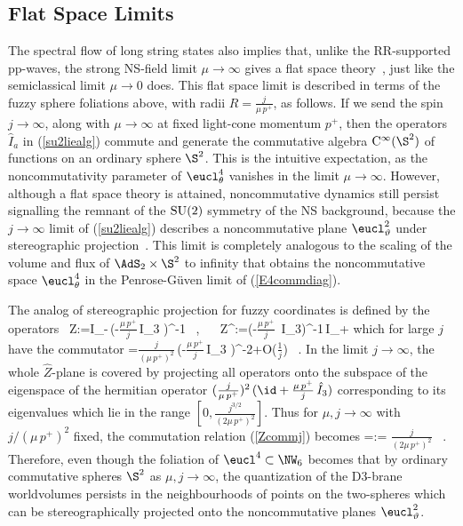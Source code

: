 \subsection{Flat Space Limits\label{FlatLim}}

The spectral flow of long string states also implies that, unlike the
RR-supported pp-waves, the strong NS-field limit $\mu\to\infty$ gives a flat
space theory~\cite{DAK1}, just like the semiclassical limit $\mu\to0$
does. This flat space limit is described in terms of the fuzzy sphere
foliations above, with radii $R=\frac j{\mu\,p^+}$, as follows. If we
send the spin $j\to\infty$, along with $\mu\to\infty$ at fixed
light-cone momentum $p^+$, then the operators $\hat I_a$ in
(\ref{su2liealg}) commute and generate the commutative algebra ${\rm
  C}^\infty(\S^2)$ of functions on an ordinary sphere $\S^2$. This is
the intuitive expectation, as the noncommutativity parameter of
$\eucl_\theta^4$ vanishes in the limit $\mu\to\infty$. However,
although a flat space theory is attained, noncommutative dynamics
still persist signalling the remnant of the ${\rm SU}(2)$ symmetry of
the NS background, because the $j\to\infty$ limit of (\ref{su2liealg})
describes a noncommutative plane $\eucl_\vartheta^2$ under
stereographic projection~\cite{APS1,CMS1}. This limit is completely
analogous to the scaling of the volume and flux of $\AdS_2\times\S^2$ to
infinity that obtains the noncommutative space $\eucl_\theta^4$ in the
Penrose-G\"uven limit of (\ref{E4commdiag}).

The analog of stereographic projection for fuzzy coordinates is
defined by the operators~\cite{APS1,CMS1}
\beq
\hat Z:=\hat I_-\,\left(\id-\mbox{$\frac{\mu\,p^+}j$}\,\hat I_3
\right)^{-1} \ , ~~ \hat Z^\dag:=\left(\id-\mbox{$\frac{\mu\,p^+}j$}\,
\hat I_3\right)^{-1}\,\hat I_+
\label{fuzzystereo}\eeq
which for large $j$ have the commutator
\beq
{}=\mbox{$\frac j{\left(\mu\,p^+
\right)^2}$}\,\left(\id-\mbox{$\frac{\mu\,p^+}j$}\,\hat I_3
\right)^{-2}+O\left(\mbox{$\frac1j$}\right) \ .
\label{Zcommj}\eeq
In the limit $j\to\infty$, the whole $\hat Z$-plane is covered by
projecting all operators onto the subspace of the eigenspace of the
hermitian operator $(\frac j{\mu\,p^+})^2\,(\id+\frac{\mu\,p^+}j\,\hat
I_3)$ corresponding to its eigenvalues which lie in the range
$[0,\frac{j^{3/2}}{(2\mu\,p^+)^2}]$. Thus for $\mu,j\to\infty$ with
$j/(\mu\,p^+)^2$ fixed, the commutation relation (\ref{Zcommj})
becomes
\beq
{}=\vartheta:=
\mbox{$\frac j{\left(2\mu\,p^+\right)^2}$} \ .
\label{Zcommtheta}\eeq
Therefore, even though the foliation of $\eucl^4\subset\NW_6$ becomes
that by ordinary commutative spheres $\S^2$ as $\mu,j\to\infty$, the
quantization of the D3-brane worldvolumes persists in the
neighbourhoods of points on the two-spheres which can be
stereographically projected onto the noncommutative planes
$\eucl_\vartheta^2$.

